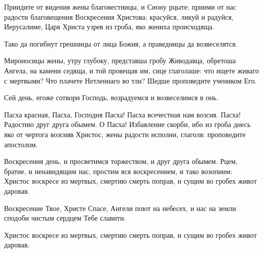 \begin{mymulticols}
Приидите от видения жены благовестницы, и Сиону рцыте: приими от нас радости благовещения Воскресения Христова; красуйся, ликуй и радуйся, Иерусалиме, Царя Христа узрев из гроба, яко жениха происходяща. 

 Тако да погибнут грешницы от лица Божия, а праведницы да возвеселятся. 

Мироносицы жены, утру глубоку, представша гробу Живодавца, обретоша Ангела, на камени седяща, и той провещав им, сице глаголаше: что ищете живаго с мертвыми? Что плачете Нетленнаго во тли? Шедше проповедите учеником Его. 

 Сей день, егоже сотвори Господь, возрадуемся и возвеселимся в онь. 

Пасха красная, Пасха, Господня Пасха! Пасха всечестная нам возсия. Пасха! Радостию друг друга обымем. О Пасха! Избавление скорби, ибо из гроба днесь яко от чертога возсияв Христос, жены радости исполни, глаголя: проповедите апостолом.

\slavainyne

Воскресения день, и просветимся торжеством, и друг друга обымем. Рцем, братие, и ненавидящим нас, простим вся воскресением, и тако возопиим: Христос воскресе из мертвых, смертию смерть поправ, и сущим во гробех живот даровав. 

\end{mymulticols}

\mychapterending

\begin{mymulticols}


Воскресение Твое, Христе Спасе, Ангели поют на небесех, и нас на земли сподоби чистым сердцем Тебе славити.


Христос воскресе из мертвых, смертию смерть поправ, и сущим во гробех живот даровав.

\end{mymulticols}

\mychapterending


